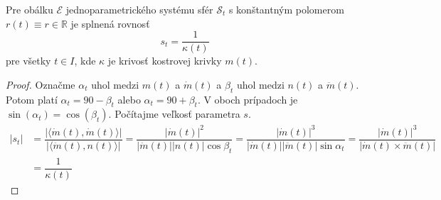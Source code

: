 \begin{lemma}
Pre obálku $\mathcal{E}$ jednoparametrického systému sfér $\mathcal{S}_t$ s konštantným polomerom $r(t) \equiv r \in \mathbb{R}$ je splnená rovnosť 
$$ s_t = \dfrac{1}{\kappa(t)} $$
pre všetky $t \in I$, kde $\kappa$ je krivosť kostrovej krivky $m(t).$
\end{lemma}

\begin{proof}
Označme $\alpha_t $ uhol medzi $m(t)$ a $\dot{m}(t)$ a $\beta_t $ uhol medzi $n(t)$ a $\ddot{m}(t)$. Potom platí $\alpha_t = 90 - \beta_t$ alebo $\alpha_t = 90 + \beta_t$. V oboch prípadoch je $\sin (\alpha_t) = \cos (\beta_t).$ Počítajme veľkosť parametra $s.$
\begin{align*}
|s_t| &= \dfrac{| \langle \dot{m}(t), \dot{m}(t) \rangle |}{ |\langle \ddot{m}(t), n(t) \rangle |} = \dfrac{| \dot{m}(t) |^2}{| \ddot{m}(t) | | n(t) | \cos \beta_t } = \dfrac{| \dot{m}(t) |^3}{| \dot{m}(t) | | \ddot{m}(t) | \sin \alpha_t } = \dfrac{| \dot{m}(t) |^3}{ | \dot{m}(t) \times \ddot{m}(t) | } \\
&= \dfrac{1}{\kappa (t)}
\end{align*} 
\end{proof}




